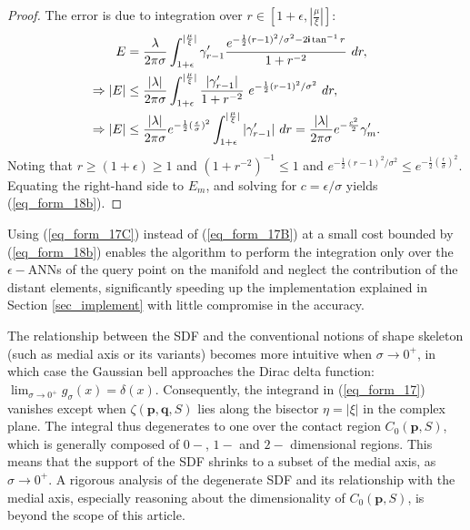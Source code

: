 \documentclass[article]{gmp2014}
\theoremstyle{definition}
\newcommand{\ii}{\text{\textsf{\textbf{i}}}}
\begin{document}
\begin{proof}
    The error is due to integration over $r \in [1 + \epsilon, |\frac{\mu}{\xi}|]$:
    \begin{align*}
        E &= \frac{\lambda}{2\pi\sigma} \int_{1+\epsilon}^{|\frac{\mu}{\xi}|} \gamma_{r-1}' \frac{e^{-\frac{1}{2}(r - 1)^2/\sigma^2 - 2 \ii \tan^{-1}r}}{1 + r^{-2}}~ dr, \\
        \Rightarrow |E| &\leq \frac{|\lambda|}{2\pi\sigma} \int_{1+\epsilon}^{|\frac{\mu}{\xi}|} \frac{ |\gamma_{r-1}'| }{1 + r^{-2}} ~e^{-\frac{1}{2}(r-1)^2/\sigma^2}~dr, \\
        \Rightarrow |E| &\leq \frac{|\lambda|}{2\pi\sigma} e^{-\frac{1}{2} (\frac{\epsilon}{\sigma})^2} \int_{1+\epsilon}^{|\frac{\mu}{\xi}|} |\gamma_{r-1}'| ~dr = \frac{|\lambda|}{2\pi\sigma} e^{-\frac{c^2}{2}} \gamma_m'.
    \end{align*}
    Noting that $r \geq (1 + \epsilon) \geq 1$ and $(1 + r^{-2})^{-1} \leq 1$ and $e^{-\frac{1}{2}(r-1)^2/\sigma^2} \leq e^{-\frac{1}{2}(\frac{\epsilon}{\sigma})^2}$. Equating the right-hand side to $E_m$, and solving for $c = \epsilon/\sigma$ yields (\ref{eq_form_18b}).
\end{proof}
%

Using (\ref{eq_form_17C}) instead of (\ref{eq_form_17B}) at a small cost bounded by (\ref{eq_form_18b}) enables the algorithm to perform the integration only over the $\epsilon-$ANNs of the query point on the manifold and neglect the contribution of the distant elements, significantly speeding up the implementation explained in Section \ref{sec_implement} with little compromise in the accuracy.

The relationship between the SDF and the conventional notions of shape skeleton (such as medial axis or its variants) becomes more intuitive when $\sigma \rightarrow 0^+$, in which case the Gaussian bell approaches the Dirac delta function: $\lim_{\sigma \rightarrow 0^+} g_\sigma(x) = \delta(x)$. Consequently, the integrand in (\ref{eq_form_17}) vanishes except when $\zeta(\mathbf{p}, \mathbf{q}, S)$ lies along the bisector $\eta = |\xi|$ in the complex plane. The integral thus degenerates to one over the contact region $C_0(\mathbf{p}, S)$, which is generally composed of $0-$, $1-$ and $2-$ dimensional regions. This means that the support of the SDF shrinks to a subset of the medial axis, as $\sigma \rightarrow 0^+$.
%
A rigorous analysis of the degenerate SDF and its relationship with the medial axis, especially reasoning about the dimensionality of $C_0(\mathbf{p}, S)$, is beyond the scope of this article.
\end{document}
